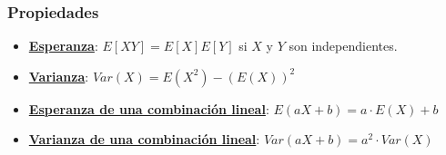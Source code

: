 \subsubsection{Propiedades}
\begin{itemize}
    \item \hyperref[sec:esperanza]{\textbf{Esperanza}}: $E[XY] = E[X]E[Y]$ si $X$ y $Y$ son independientes.
    \item \hyperref[sec:varianza]{\textbf{Varianza}}: $Var(X) = E(X^2) - (E(X))^2$ 

    \item \hyperref[sec:esperanzaCombinacion]{\textbf{Esperanza de una combinación lineal}}: $E(aX + b) = a \cdot E(X) + b$

    \item \hyperref[sec:varianzaCombinacion]{\textbf{Varianza de una combinación lineal}}: $Var(aX + b) = a^2 \cdot Var(X)$
\end{itemize}

